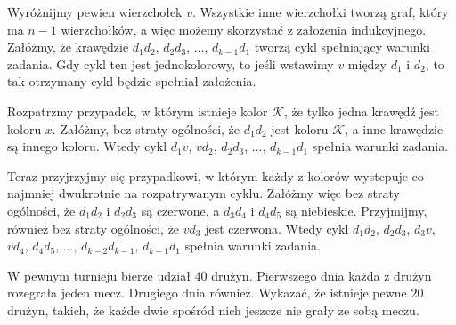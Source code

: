 \vspace{5px}

\noindent
Wyróżnijmy pewien wierzchołek $v$. Wszystkie inne wierzchołki tworzą graf, który ma $n - 1$ wierzchołków, a więc możemy skorzystać z założenia indukcyjnego. Załóżmy, że krawędzie $d_1d_2$, $d_2d_3$, ..., $d_{k-1}d_1$ tworzą cykl spełniający warunki zadania. Gdy cykl ten jest jednokolorowy, to jeśli wstawimy $v$ między $d_1$ i $d_2$, to tak otrzymany cykl będzie spełniał założenia. 

\vspace{5px}

\noindent
Rozpatrzmy przypadek, w którym istnieje kolor $\mathcal{K}$, że tylko jedna krawędź jest koloru $x$. Załóżmy, bez straty ogólności, że $d_1d_2$ jest koloru $\mathcal{K}$, a inne krawędzie są innego koloru. Wtedy cykl $d_1v$, $vd_2$, $d_2d_3$, ..., $d_{k-1}d_1$ spełnia warunki zadania. 

\vspace{5px}

\begin{center}
\end{center}


\noindent
Teraz przyjrzyjmy się przypadkowi, w którym każdy z kolorów wystepuje co najmniej dwukrotnie na rozpatrywanym cyklu.
Załóżmy więc bez straty ogólności, że $d_1d_2$ i $d_2d_3$ są czerwone, a $d_3d_4$ i $d_4d_5$ są niebieskie. Przyjmijmy, również bez straty ogólności, że $vd_3$ jest czerwona. Wtedy cykl $d_1d_2$, $d_2d_3$, $d_3v$, $vd_4$, $d_4d_5$, ..., $d_{k-2}d_{k-1}$, $d_{k-1}d_1$ spełnia warunki zadania.

\vspace{5px}

\begin{problem}{3}
	W pewnym turnieju bierze udział $40$ drużyn. Pierwszego dnia każda z drużyn rozegrała jeden mecz. Drugiego dnia również. Wykazać, że istnieje pewne $20$ drużyn, takich, że każde dwie spośród nich jeszcze nie grały ze sobą meczu.
\end{problem}

